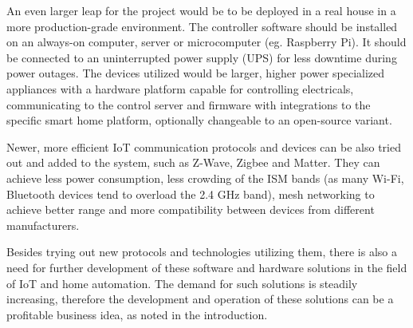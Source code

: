 An even larger leap for the project would be to be deployed in a real house in a more production-grade environment. The controller software should be installed on an always-on computer, server or microcomputer (eg. Raspberry Pi). It should be connected to an uninterrupted power supply (UPS) for less downtime during power outages. The devices utilized would be larger, higher power specialized appliances with a hardware platform capable for controlling electricals, communicating to the control server and firmware with integrations to the specific smart home platform, optionally changeable to an open-source variant.

Newer, more efficient IoT communication protocols and devices can be also tried out and added to the system, such as Z-Wave, Zigbee and Matter. They can achieve less power consumption, less crowding of the ISM bands (as many Wi-Fi, Bluetooth devices tend to overload the 2.4 GHz band), mesh networking to achieve better range and more compatibility between devices from different manufacturers.

Besides trying out new protocols and technologies utilizing them, there is also a need for further development of these software and hardware solutions in the field of IoT and home automation. The demand for such solutions is steadily increasing, therefore the development and operation of these solutions can be a profitable business idea, as noted in the introduction.
